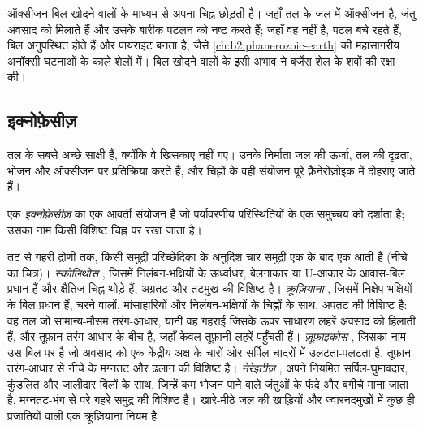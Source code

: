 ऑक्सीजन बिल खोदने वालों के माध्यम से अपना चिह्न छोड़ती है। जहाँ तल के जल में ऑक्सीजन है, जंतु
अवसाद को मिलाते हैं और उसके बारीक पटलन को नष्ट करते हैं; जहाँ वह नहीं है, पटल बचे रहते हैं, बिल
अनुपस्थित होते हैं और पायराइट बनता है, जैसे \cref{ch:b2:phanerozoic-earth} की महासागरीय अनॉक्सी घटनाओं
के काले शेलों में। बिल खोदने वालों के इसी अभाव ने बर्जेस शेल के
शवों की रक्षा की।

\subsection*{इक्नोफ़ेसीज़}

 तल के सबसे अच्छे साक्षी हैं, क्योंकि वे खिसकाए नहीं गए। उनके निर्माता
जल की ऊर्जा, तल की दृढ़ता, भोजन और ऑक्सीजन पर प्रतिक्रिया करते हैं, और
चिह्नों के वही संयोजन पूरे फ़ैनेरोज़ोइक में दोहराए जाते हैं।

\begin{definition}[इक्नोफ़ेसीज़]\label{def:b2:palaeoenvironments:ichnofacies}
एक \emph{इक्नोफ़ेसीज़}  का एक आवर्ती संयोजन है जो
पर्यावरणीय परिस्थितियों के एक समुच्चय को दर्शाता है; उसका नाम किसी विशिष्ट चिह्न पर रखा जाता है।
\end{definition}

तट से गहरी द्रोणी तक, किसी समुद्री परिच्छेदिका के अनुदिश चार समुद्री  एक के बाद एक
आती हैं (नीचे का चित्र)। \emph{स्कोलिथोस} , जिसमें निलंबन-भक्षियों के ऊर्ध्वाधर, बेलनाकार या
U-आकार के आवास-बिल प्रधान हैं और क्षैतिज चिह्न थोड़े हैं, अग्रतट और तटमुख की
विशिष्ट है। \emph{क्रूज़ियाना} , जिसमें निक्षेप-भक्षियों के बिल प्रधान हैं,
चरने वालों, मांसाहारियों और निलंबन-भक्षियों के चिह्नों के साथ, अपतट की विशिष्ट है:
वह तल जो सामान्य-मौसम तरंग-आधार, यानी वह गहराई जिसके ऊपर साधारण लहरें अवसाद को हिलाती हैं,
और तूफ़ान तरंग-आधार के बीच है, जहाँ केवल तूफ़ानी लहरें पहुँचती हैं। \emph{ज़ूफ़ाइकोस}
, जिसका नाम उस बिल पर है जो अवसाद को एक केंद्रीय अक्ष के चारों ओर सर्पिल चादरों में
उलटता-पलटता है, तूफ़ान तरंग-आधार से नीचे के मग्नतट और ढलान की विशिष्ट है। \emph{नेरेइटीज़}
, अपने नियमित सर्पिल-घुमावदार, कुंडलित और जालीदार बिलों के साथ, जिन्हें कम भोजन पाने वाले जंतुओं
के फंदे और बगीचे माना जाता है, मग्नतट-भंग से परे गहरे समुद्र की विशिष्ट है।
खारे-मीठे जल की खाड़ियों और ज्वारनदमुखों में कुछ ही प्रजातियों वाली एक क्रूज़ियाना  नियम है।

